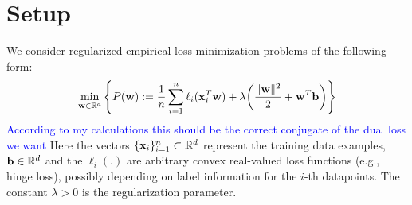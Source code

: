 \documentclass{article}
\newcommand{\cocoap}{\textsc{CoCoA$\!^{\bf \textbf{\footnotesize+}}$}\xspace}
\newcommand{\eqdef}{:=}
\newcommand{\R}{\mathbb{R}}                      %
\newcommand{\N}{n}                               %
\newcommand{\xv}{ {\bf x}}
\newcommand{\wv}{ {\bf w}}
\newcommand{\bv}{ {\bf b}}
\newcommand{\0}{ {\bf 0}}
\theoremstyle{plain}
\theoremstyle{definition}
\begin{document}
 


%
\section{Setup}
We consider regularized empirical loss minimization problems of the following form:\vspace{-2mm}
\begin{equation}
\label{eq:primal}
 \min_{\wv\in \R^d} 
 \left\{
 P(\wv)\eqdef  
  \frac1{\N} \sum_{i=1}^\N \ell_i( \xv_i^T \wv) + \lambda \bigg(\frac{\|\wv\|^2}{2} + \wv^T\bv\bigg)\right\}
\end{equation}
\textcolor{blue}{According to my calculations this should be the correct conjugate of the dual loss we want}
Here the vectors $\{\xv_i\}_{i=1}^n \subset \R^d$ represent the training data examples, $\bv \in \R^d$ and the
$\ell_i(.)$ are arbitrary convex real-valued loss functions (e.g., hinge loss), possibly depending on label information
for the $i$-th datapoints. The constant $\lambda>0$ is the regularization parameter.
\end{document}
